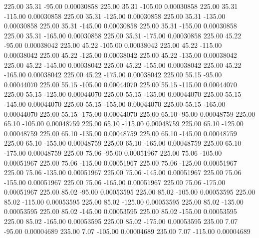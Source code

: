    225.00     35.31    -95.00     0.00030858
    225.00     35.31   -105.00     0.00030858
    225.00     35.31   -115.00     0.00030858
    225.00     35.31   -125.00     0.00030858
    225.00     35.31   -135.00     0.00030858
    225.00     35.31   -145.00     0.00030858
    225.00     35.31   -155.00     0.00030858
    225.00     35.31   -165.00     0.00030858
    225.00     35.31   -175.00     0.00030858
    225.00     45.22    -95.00     0.00038042
    225.00     45.22   -105.00     0.00038042
    225.00     45.22   -115.00     0.00038042
    225.00     45.22   -125.00     0.00038042
    225.00     45.22   -135.00     0.00038042
    225.00     45.22   -145.00     0.00038042
    225.00     45.22   -155.00     0.00038042
    225.00     45.22   -165.00     0.00038042
    225.00     45.22   -175.00     0.00038042
    225.00     55.15    -95.00     0.00044070
    225.00     55.15   -105.00     0.00044070
    225.00     55.15   -115.00     0.00044070
    225.00     55.15   -125.00     0.00044070
    225.00     55.15   -135.00     0.00044070
    225.00     55.15   -145.00     0.00044070
    225.00     55.15   -155.00     0.00044070
    225.00     55.15   -165.00     0.00044070
    225.00     55.15   -175.00     0.00044070
    225.00     65.10    -95.00     0.00048759
    225.00     65.10   -105.00     0.00048759
    225.00     65.10   -115.00     0.00048759
    225.00     65.10   -125.00     0.00048759
    225.00     65.10   -135.00     0.00048759
    225.00     65.10   -145.00     0.00048759
    225.00     65.10   -155.00     0.00048759
    225.00     65.10   -165.00     0.00048759
    225.00     65.10   -175.00     0.00048759
    225.00     75.06    -95.00     0.00051967
    225.00     75.06   -105.00     0.00051967
    225.00     75.06   -115.00     0.00051967
    225.00     75.06   -125.00     0.00051967
    225.00     75.06   -135.00     0.00051967
    225.00     75.06   -145.00     0.00051967
    225.00     75.06   -155.00     0.00051967
    225.00     75.06   -165.00     0.00051967
    225.00     75.06   -175.00     0.00051967
    225.00     85.02    -95.00     0.00053595
    225.00     85.02   -105.00     0.00053595
    225.00     85.02   -115.00     0.00053595
    225.00     85.02   -125.00     0.00053595
    225.00     85.02   -135.00     0.00053595
    225.00     85.02   -145.00     0.00053595
    225.00     85.02   -155.00     0.00053595
    225.00     85.02   -165.00     0.00053595
    225.00     85.02   -175.00     0.00053595
    235.00      7.07    -95.00     0.00004689
    235.00      7.07   -105.00     0.00004689
    235.00      7.07   -115.00     0.00004689
